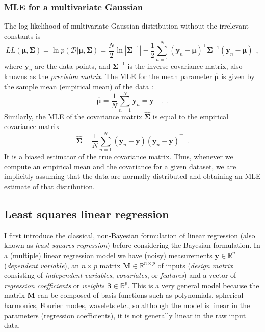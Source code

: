 \documentclass[12pt,dvipsnames]{report}
\renewcommand{\vec}[1]{\boldsymbol{\mathbf{#1}}}
\newcommand{\hquad}{~~}
\begin{document}
\subsubsection{MLE for a multivariate Gaussian}
The log-likelihood of multivariate Gaussian distribution without the
irrelevant constants is
\begin{equation}
    L L(\boldsymbol{\mu}, \boldsymbol{\Sigma})=\ln p(\mathcal{D} \lvert \boldsymbol{\mu}, \boldsymbol{\Sigma})=\frac{N}{2} \ln |\vec{\Sigma}^{-1}|-\frac{1}{2} \sum_{n=1}^{N}\left(\boldsymbol{y}_{n}-\boldsymbol{\mu}\right)^{\intercal} \vec{\Sigma}^{-1}\left(\boldsymbol{y}_{n}-\boldsymbol{\mu}\right)
    \hquad,
\end{equation}
where $\vec{y}_n$ are the data points, and $\vec{\Sigma}^{-1}$ is
the inverse covariance matrix, also knowns as the \emph{precision matrix}.
The MLE for the mean parameter $\hat{\vec{\mu}}$
is given by the sample mean (empirical mean) of the data \citep{murphy_book_2022}:
\begin{equation}
    \hat{\boldsymbol{\mu}}=\frac{1}{N} \sum_{n=1}^{N} \boldsymbol{y}_{n}=\overline{\boldsymbol{y}}\quad .
    \hquad.
\end{equation}
Similarly, the MLE of the covariance matrix $\hat{\vec{\Sigma}}$ is equal to
the empirical covariance matrix
\begin{equation}
    \hat{\boldsymbol{\Sigma}}=\frac{1}{N} \sum_{n=1}^{N}\left(\boldsymbol{y}_{n}-\overline{\boldsymbol{y}}\right)\left(\boldsymbol{y}_{n}-\overline{\boldsymbol{y}}\right)^{\intercal}
    \hquad.
\end{equation}
It is a biased estimator of the true covariance matrix. 
Thus, whenever we compute an empirical mean and the covariance for a given dataset, we
are implicitly assuming that the data are normally distributed and obtaining an MLE
estimate of that distribution.

\subsection{Least squares linear regression}
\label{ssec:least_squares}
I first introduce the classical, non-Bayesian formulation of linear
regression (also known as \emph{least squares regression}) before considering the 
Bayesian formulation. In a (multiple) linear regression
model we have (noisy) measurements $\vec{y}\in \mathbb{R}^n$ (\emph{dependent
    variable}), an $n\times p$ matrix $\vec{M}\in \mathbb{R}^{n\times p}$ of inputs
(\emph{design matrix} consisting of \emph{independent variables},
\emph{covariates}, or \emph{features}) and a vector of \emph{regression
    coefficients} or \emph{weights} $\vec{\beta}\in \mathbb{R}^p$. This is a very
general model because the matrix $\vec{M}$ can be composed of basis functions such
as polynomials, spherical harmonics, Fourier modes, wavelets etc., so although
the model is linear in the parameters (regression coefficients), it is not
generally linear in the raw input data. 
\end{document}
